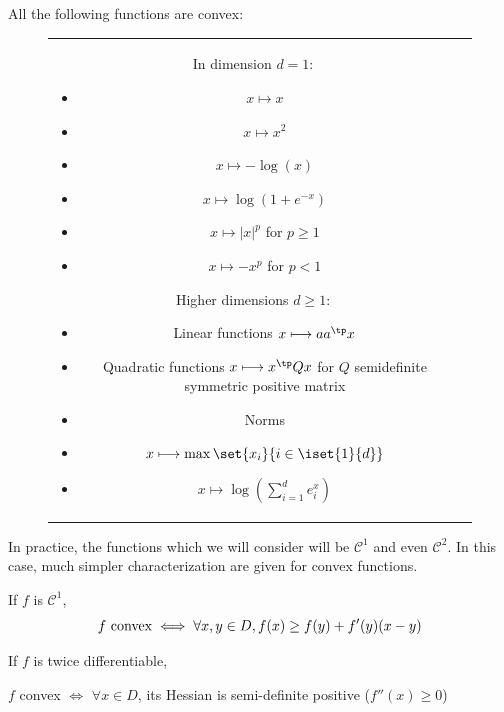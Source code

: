 \documentclass[toc, titlepaged]{../cs-classes/cs-classes}
\begin{document}
\begin{example}
    \leavevmode
    All the following functions are convex:
    \begin{figure}[H]
        \centering
        \begin{tabular}{c c}
            \begin{minipage}{0.45\textwidth}
                \vspace*{-0.4cm}
                In dimension $d=1$:
                \begin{itemize}
                    \item $x\longmapsto x$
                    \item $x\longmapsto x^2$
                    \item $x\longmapsto -\log(x)$
                    \item $x\longmapsto \log(1+e^{-x})$
                    \item $x\longmapsto |x|^p$ for $p\geq1$
                    \item $x\longmapsto -x^p$ for $p<1$
                \end{itemize}
            \end{minipage}
            \begin{minipage}{0.5\textwidth}
                Higher dimensions $d\geq1$:
                \begin{itemize}
                    \item Linear functions $x\longmapsto aa^\tp x$
                    \item Quadratic functions $x\longmapsto x^\tp Qx$ for $Q$ semidefinite symmetric positive matrix
                    \item Norms
                    \item $x\longmapsto\max\set{x_i}{i\in\iset{1}{d}}$
                    \item $x\longmapsto\log\left(\sum_{i=1}^de_i^x\right)$
                \end{itemize}
            \end{minipage}
        \end{tabular}
    \end{figure}
\end{example}

In practice, the functions which we will consider will be $\mathcal{C}^1$ and even $\mathcal{C}^2$. In this case, much simpler characterization are given for convex functions.

\begin{property}
    If $f$ is $\mathcal{C}^1$,
    \begin{equation*}
        f \textnormal{ convex} \iff \forall x, y\in D, f(x)\geq f(y) + f'(y)(x-y)
    \end{equation*}
\end{property}
\begin{property}
    If $f$ is twice differentiable,
    \begin{center}
        $f$ convex $\iff$ $\forall x\in D$, its Hessian is semi-definite positive ($f''(x)\geq0$)
    \end{center}
\end{property}
\end{document}
